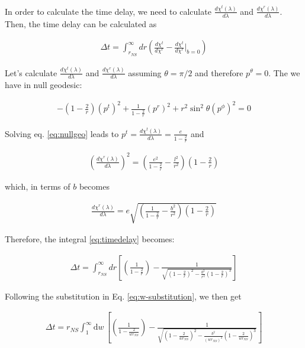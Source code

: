 \documentclass[modern]{aastex631}
\begin{document}
In order to calculate the time delay, we need to calculate $\frac{d\chi^t(\lambda)}{d\lambda}$ and $\frac{d\chi^r(\lambda)}{d\lambda}$. Then, the time delay
can be calculated as 
%
\begin{linenomath}\begin{align}
    \label{eq:timedelay}
    \Delta t = \int_{r_{NS}}^{\infty} dr \left(\frac{d\chi^t}{d\chi^r} - \frac{d\chi^t}{d\chi^r}\vert_{b=0} \right)
\end{align}\end{linenomath}
%

Let's calculate $\frac{d\chi^t(\lambda)}{d\lambda}$ and $\frac{d\chi^r(\lambda)}{d\lambda}$ assuming $\theta=\pi/2$ and therefore $p^\theta = 0$. The we have
in null geodesic:
%
\begin{linenomath}\begin{align}
    \label{eq:nullgeo}
    -(1-\frac{2}{r})(p^t)^2 + \frac{1}{1-\frac{2}{r}}(p^r)^2 + r^2\sin^2 \theta (p^\phi)^2 = 0
\end{align}\end{linenomath}
%
Solving eq. \ref{eq:nullgeo} leads to $p^t = \frac{d\chi^t(\lambda)}{d\lambda} = \frac{e}{1-\frac{2}{r}}$ and 
%
\begin{linenomath}\begin{align}
    \label{eq:pr-squared}
    \left(\frac{d\chi^r(\lambda)}{d\lambda}\right)^2 = \left(\frac{e^2}{1-\frac{2}{r}} - \frac{l^2}{r^2}\right) \left(1-\frac{2}{r}\right)
\end{align}\end{linenomath}
%
which, in terms of $b$ becomes
%
\begin{linenomath}\begin{align}
    \label{eq:pr-b}
    \frac{d\chi^r(\lambda)}{d\lambda} = e\sqrt{\left(\frac{1}{1-\frac{2}{r}} - \frac{b^2}{r^2}\right) \left(1-\frac{2}{r}\right)}
\end{align}\end{linenomath}
%
Therefore, the integral \ref{eq:timedelay} becomes:
%
\begin{linenomath}\begin{align}
    \label{eq:timedelayfull}
    \Delta t = \int_{r_{NS}}^{\infty} dr \left[\left(\frac{1}{1-\frac{2}{r}}\right) - \frac{1}{\sqrt{\left(1-\frac{2}{r}\right)^2 - \frac{b^2}{r^2}\left(1-\frac{2}{r}\right)^3}}\right]
\end{align}\end{linenomath}
%
Following the substitution in Eq. \ref{eq:w-substitution}, we then get
%
\begin{linenomath}\begin{align}
    \label{eq:tdelay-with-w}
    \Delta t = r_{NS} \int_{1}^{\infty} \mathrm{d} w \, \left[\left(\frac{1}{1-\frac{2}{wr_{NS}}}\right) - \frac{1}{\sqrt{\left(1-\frac{2}{wr_{NS}}\right)^2 - \frac{b^2}{(wr_{NS})^2}\left(1-\frac{2}{wr_{NS}}\right)^3}}\right]
\end{align}\end{linenomath}
\end{document}
